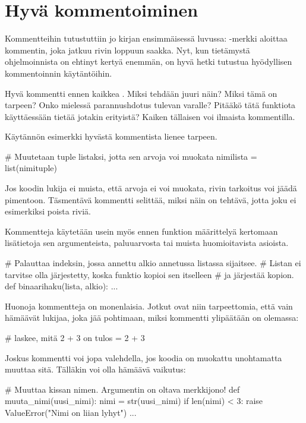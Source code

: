 \section{Hyvä kommentoiminen}

Kommentteihin tutustuttiin jo kirjan ensimmäisessä luvussa: \code{\#}-merkki aloittaa kommentin, joka jatkuu rivin loppuun saakka. Nyt, kun tietämystä ohjelmoinnista on ehtinyt kertyä enemmän, on hyvä hetki tutustua hyödyllisen kommentoinnin käytäntöihin.

Hyvä kommentti ennen kaikkea . Miksi tehdään juuri näin? Miksi tämä on tarpeen? Onko mielessä parannushdotus tulevan varalle? Pitääkö tätä funktiota käyttäessään tietää jotakin erityistä? Kaiken tällaisen voi ilmaista kommentilla.

Käytännön esimerkki hyvästä kommentista lienee tarpeen.

\begin{python}
# Muutetaan tuple listaksi, jotta sen arvoja voi muokata
nimilista = list(nimituple)
\end{python}

Jos koodin lukija ei muista, että  arvoja ei voi muokata, rivin tarkoitus voi jäädä pimentoon. Täsmentävä kommentti selittää, miksi näin on tehtävä, jotta joku ei esimerkiksi poista riviä.

Kommentteja käytetään usein myös ennen funktion määrittelyä kertomaan lisätietoja sen argumenteista, paluuarvosta tai muista huomioitavista asioista.

\begin{python}
# Palauttaa indeksin, jossa annettu alkio annetussa listassa sijaitsee.
# Listan ei tarvitse olla järjestetty, koska funktio kopioi sen itselleen
# ja järjestää kopion.
def binaarihaku(lista, alkio):
	...
\end{python}

Huonoja kommentteja on monenlaisia. Jotkut ovat niin tarpeettomia, että vain hämäävät lukijaa, joka jää pohtimaan, miksi kommentti ylipäätään on olemassa:

\begin{python}
# laskee, mitä 2 + 3 on
tulos = 2 + 3
\end{python}

Joskus kommentti voi jopa valehdella, jos koodia on muokattu unohtamatta muuttaa sitä. Tälläkin voi olla hämäävä vaikutus:

\begin{python}
# Muuttaa kissan nimen. Argumentin on oltava merkkijono!
def muuta_nimi(uusi_nimi):
	nimi = str(uusi_nimi)
	if len(nimi) < 3:
		raise ValueError("Nimi on liian lyhyt")
	...
\end{python}

